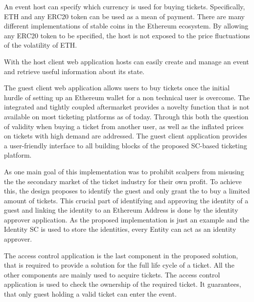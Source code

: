 An event host can specify which currency is used for buying tickets. Specifically, ETH and any ERC20 token can be used as a mean of payment. There are many different implementations of stable coins in the Ethereum ecosystem. By allowing any ERC20 token to be specified, the host is not exposed to the price fluctuations of the volatility of ETH. 

With the host client web application hosts can easily create and manage an event and retrieve useful information about its state.

The guest client web application allows users to buy tickets once the initial hurdle of setting up an Ethereum wallet for a non technical user is overcome. The integrated and tightly coupled aftermarket provides a novelty function that is not available on most ticketing platforms as of today. Through this both the question of validity when buying a ticket from another user, as well as the inflated prices on tickets with high demand are addressed. The guest client application provides a user-friendly interface to all building blocks of the proposed SC-based ticketing platform.

As one main goal of this implementation was to prohibit scalpers from misusing the the secondary market of the ticket industry for their own profit. To achieve this, the design proposes to identify the guest and only grant the to buy a limited amount of tickets. This crucial part of identifying and approving the identity of a guest and linking the identity to an Ethereum Address is done by the identity approver application. As the proposed implementation is just an example and the Identity SC is used to store the identities, every Entity can act as an identity approver.

The access control application is the last component in the proposed solution, that is required to provide a solution for the full life cycle of a ticket. All the other components are mainly used to acquire tickets. The access control application is used to check the ownership of the required ticket. It guarantees, that only guest holding a valid ticket can enter the event. 
